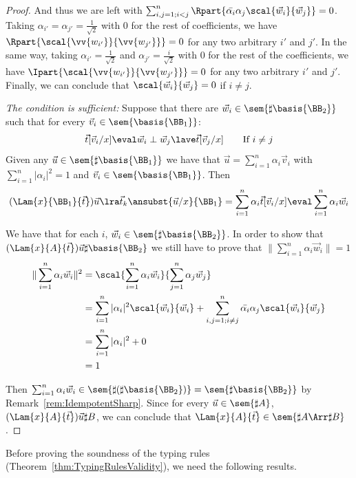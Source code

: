 \begin{proof}
  And thus we are left with $\sum_{i,j=1; i<j}^n \Rpart{\bar{\alpha_i}\alpha_j \scal{\vec{w}_{i}}{\vec{w}_{j}}} = 0$. Taking $\alpha_{i'} = \alpha_{j'} = \frac{1}{\sqrt{2}}$ with $0$ for the rest of coefficients, we have $\Rpart{\scal{\vv{w_{i'}}}{\vv{w_{j'}}}} = 0$ for any two arbitrary $i'$ and $j'$. In the same way, taking $\alpha_{i'} = \frac{1}{\sqrt{2}}$ and $\alpha_{j'}=\frac{i}{\sqrt{2}}$ with $0$ for the rest of the coefficients, we have $\Ipart{\scal{\vv{w_{i'}}}{\vv{w_{j'}}}} = 0$ for any two arbitrary $i'$ and $j'$. Finally, we can conclude that $\scal{\vec{w}_{i}}{\vec{w}_{j}}=0$ if $i\neq j$.

  \textit{The condition is sufficient:} Suppose that there are $\vec{w}_{i}\in\sem{\sharp\basis{\BB_2}}$ such that for every $\vec{v}_{i}\in\sem{\basis{\BB_1}}$:
  \[
    \vec t[\vec{v}_{i}/x] \eval \vec{w}_{i} \perp \vec{w}_{j} \lave \vec t[\vec{v}_{j}/x]\qquad \text{If } i\neq j
  \]
  Given any $\vec u\in\sem{\sharp\basis{\BB_1}}$ we have that $\vec u = \sum_{i=1}^n \alpha_i \vec{v}_{i}$ with $\sum_{i=1}^n |\alpha_i|^2 = 1$ and $\vec{v}_{i}\in\sem{\basis{\BB_1}}$. Then 
  \[
    (\Lam{x}{{\BB_1}}{\vec t}) \vec u \lra \vec{t}_{k}\ansubst{\vec u/x}{\BB_1}=\sum_{i=1}^{n}\alpha_i \vec{t}[\vec{v}_{i}/x]\eval\sum_{i=1}^n \alpha_i\vec{w}_{i}
  \]

  We have that for each $i$, $\vec{w}_{i}\in\sem{\sharp\basis{\BB_2}}$. In order to show that $(\Lam{x}{A}{\vec t})\vec u\real\sharp\basis{\BB_2}$ we still have to prove that $\|\sum_{i=1}^n \alpha_i \vec{w}_{i}\| = 1$
  \begin{align*}
    \|\sum_{i=1}^n \alpha_i \vec{w}_{i}\|^2 &= \scal{\sum_{i=1}^n \alpha_i \vec{w}_{i}}{\sum_{j=1}^n \alpha_j \vec{w}_{j}}\\
    &=\sum_{i=1}^n |\alpha_i|^2 \scal{\vec{w}_{i}}{\vec{w}_{i} } + \sum_{i,j=1; i\neq j}^n \bar{\alpha_i}\alpha_j \scal{\vec{w}_{i}}{\vec{w}_{j}}\\
    &=\sum_{i=1}^n |\alpha_i|^2 + 0\\
    &= 1
  \end{align*}

  Then $\sum_{i=1}^n \alpha_i \vec{w}_{i}\in\sem{\sharp(\sharp\basis{\BB_2})}=\sem{\sharp\basis{\BB_2}}$ by Remark~\ref{rem:IdempotentSharp}. Since for every $\vec u\in\sem{\sharp A}$, $(\Lam{x}{A}{\vec t}) \vec u\real\sharp B$, we can conclude that $\Lam{x}{A}{\vec t}\in\sem{\sharp A\Arr\sharp B}$.\qedhere
\end{proof}

Before proving the soundness of the typing rules (Theorem~\ref{thm:TypingRulesValidity}), we need the following results.

